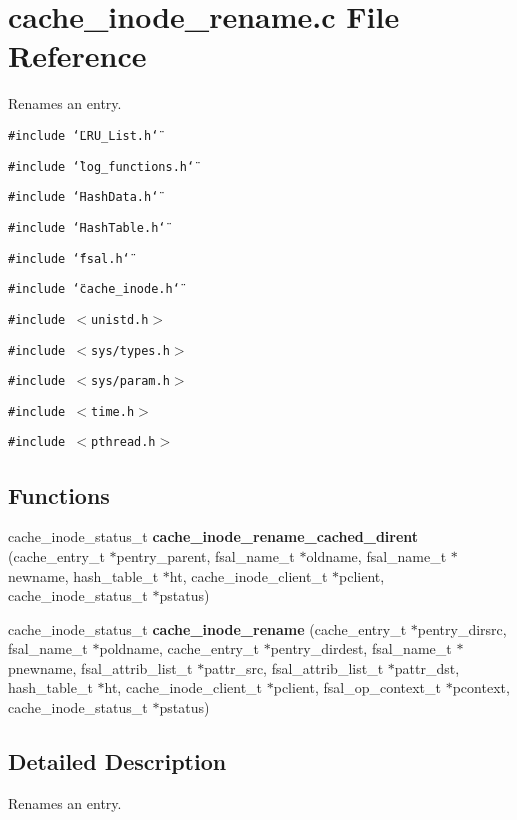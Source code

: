 \section{cache\_\-inode\_\-rename.c File Reference}
\label{cache__inode__rename_8c}
Renames an entry. 

{\tt \#include \char`\"{}LRU\_\-List.h\char`\"{}}\par
{\tt \#include \char`\"{}log\_\-functions.h\char`\"{}}\par
{\tt \#include \char`\"{}Hash\-Data.h\char`\"{}}\par
{\tt \#include \char`\"{}Hash\-Table.h\char`\"{}}\par
{\tt \#include \char`\"{}fsal.h\char`\"{}}\par
{\tt \#include \char`\"{}cache\_\-inode.h\char`\"{}}\par
{\tt \#include $<$unistd.h$>$}\par
{\tt \#include $<$sys/types.h$>$}\par
{\tt \#include $<$sys/param.h$>$}\par
{\tt \#include $<$time.h$>$}\par
{\tt \#include $<$pthread.h$>$}\par
\subsection*{Functions}
\begin{CompactItemize}
\item 
cache\_\-inode\_\-status\_\-t {\bf cache\_\-inode\_\-rename\_\-cached\_\-dirent} (cache\_\-entry\_\-t $\ast$pentry\_\-parent, fsal\_\-name\_\-t $\ast$oldname, fsal\_\-name\_\-t $\ast$newname, hash\_\-table\_\-t $\ast$ht, cache\_\-inode\_\-client\_\-t $\ast$pclient, cache\_\-inode\_\-status\_\-t $\ast$pstatus)
\item 
cache\_\-inode\_\-status\_\-t {\bf cache\_\-inode\_\-rename} (cache\_\-entry\_\-t $\ast$pentry\_\-dirsrc, fsal\_\-name\_\-t $\ast$poldname, cache\_\-entry\_\-t $\ast$pentry\_\-dirdest, fsal\_\-name\_\-t $\ast$pnewname, fsal\_\-attrib\_\-list\_\-t $\ast$pattr\_\-src, fsal\_\-attrib\_\-list\_\-t $\ast$pattr\_\-dst, hash\_\-table\_\-t $\ast$ht, cache\_\-inode\_\-client\_\-t $\ast$pclient, fsal\_\-op\_\-context\_\-t $\ast$pcontext, cache\_\-inode\_\-status\_\-t $\ast$pstatus)
\end{CompactItemize}


\subsection{Detailed Description}
Renames an entry. 

